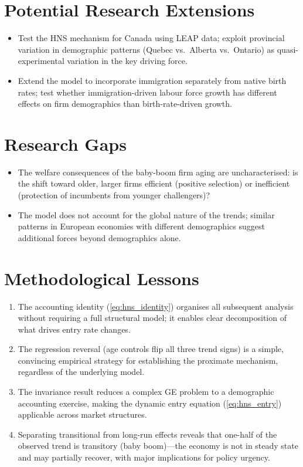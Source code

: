 \section{Potential Research Extensions}

\begin{itemize}
  \item Test the HNS mechanism for Canada using LEAP data; exploit
    provincial variation in demographic patterns (Quebec vs.\ Alberta
    vs.\ Ontario) as quasi-experimental variation in the key driving force.
  \item Extend the model to incorporate immigration separately from
    native birth rates; test whether immigration-driven labour force growth
    has different effects on firm demographics than birth-rate-driven growth.
\end{itemize}

\section{Research Gaps}

\begin{itemize}
  \item The welfare consequences of the baby-boom firm aging are
    uncharacterised: is the shift toward older, larger firms efficient
    (positive selection) or inefficient (protection of incumbents from
    younger challengers)?
  \item The model does not account for the global nature of the trends;
    similar patterns in European economies with different demographics
    suggest additional forces beyond demographics alone.
\end{itemize}

\section{Methodological Lessons}

\begin{enumerate}
  \item The accounting identity (\ref{eq:hns_identity}) organises all
    subsequent analysis without requiring a full structural model; it
    enables clear decomposition of what drives entry rate changes.
  \item The regression reversal (age controls flip all three trend signs)
    is a simple, convincing empirical strategy for establishing the proximate
    mechanism, regardless of the underlying model.
  \item The invariance result reduces a complex GE problem to a demographic
    accounting exercise, making the dynamic entry equation (\ref{eq:hns_entry})
    applicable across market structures.
  \item Separating transitional from long-run effects reveals that one-half of
    the observed trend is transitory (baby boom)---the economy is not in steady
    state and may partially recover, with major implications for policy urgency.
\end{enumerate}


